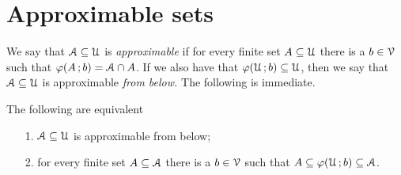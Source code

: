 \documentclass[scombinatorics.tex]{subfiles}
\begin{document}
\section{Approximable sets}

We say that $\EuScript A\subseteq\EuScript U$ is \emph{approximable\/} if for every finite set $A\subseteq\EuScript U$ there is a $b\in\EuScript V$ such that $\varphi(A\,;b)=\EuScript A\cap A$.
If we also have that $\varphi(\EuScript U\,;b)\subseteq\EuScript U$, then we say that $\EuScript A\subseteq\EuScript U$ is approximable \emph{from below.} The following is immediate.

\begin{fact}
  The following are equivalent
  \begin{itemize}
    \item[1.] $\EuScript A\subseteq\EuScript U$ is approximable from below;
    \item[2.] for every finite set $A\subseteq\EuScript A$ there is a $b\in\EuScript V$ such that $A\subseteq\varphi(\EuScript U\,;b)\subseteq\EuScript A$.\QED
  \end{itemize}
\end{fact}





  

  
\end{document}
